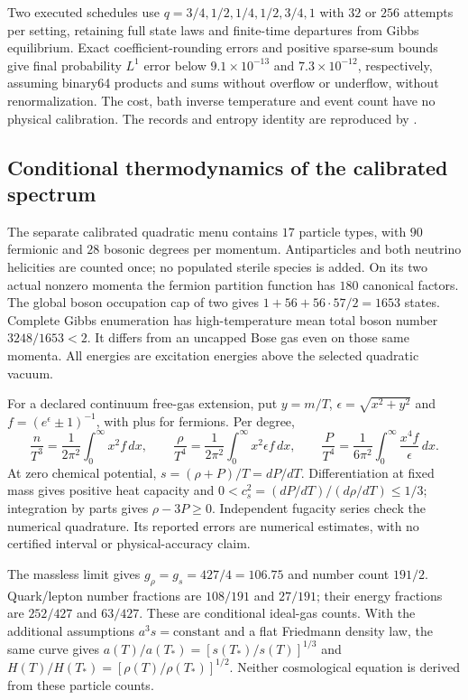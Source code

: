 Two executed schedules use $q=3/4,1/2,1/4,1/2,3/4,1$ with $32$ or $256$
attempts per setting, retaining full state laws and finite-time departures
from Gibbs equilibrium. Exact coefficient-rounding errors and positive
sparse-sum bounds give final probability $L^1$ error below
$9.1\times10^{-13}$ and $7.3\times10^{-12}$, respectively, assuming
binary64 products and sums without overflow or underflow, without
renormalization. The cost,
bath inverse temperature and event count have no physical calibration.
The records and entropy identity are reproduced by
 \cite{ophrepo}.

\subsection{Conditional thermodynamics of the calibrated spectrum}

The separate calibrated quadratic menu contains $17$ particle types,
with $90$ fermionic and $28$ bosonic degrees per momentum. Antiparticles
and both neutrino helicities are counted once; no populated sterile
species is added. On its two actual nonzero momenta the fermion
partition function has $180$ canonical factors. The global boson
occupation cap of two gives $1+56+56\cdot57/2=1653$ states. Complete
Gibbs enumeration has high-temperature mean total boson number
$3248/1653<2$. It differs from an uncapped Bose gas even on those same
momenta. All energies are excitation energies above the selected
quadratic vacuum.

For a declared continuum free-gas extension, put
$y=m/T$, $\epsilon=\sqrt{x^2+y^2}$ and
$f=(e^\epsilon\pm1)^{-1}$, with plus for fermions. Per degree,
\[
 \frac{n}{T^3}=\frac1{2\pi^2}\int_0^\infty x^2f\,dx,\qquad
 \frac{\rho}{T^4}=\frac1{2\pi^2}\int_0^\infty x^2\epsilon f\,dx,
 \qquad
 \frac{P}{T^4}=\frac1{6\pi^2}\int_0^\infty\frac{x^4f}{\epsilon}\,dx.
\]
At zero chemical potential, $s=(\rho+P)/T=dP/dT$.
Differentiation at fixed mass gives positive heat capacity and
$0<c_s^2=(dP/dT)/(d\rho/dT)\leq1/3$; integration by parts gives
$\rho-3P\geq0$. Independent fugacity series check the numerical
quadrature. Its reported errors are numerical estimates, with no
certified interval or physical-accuracy claim.

The massless limit gives $g_{\rho}=g_s=427/4=106.75$ and number count
$191/2$. Quark/lepton number fractions are $108/191$ and $27/191$;
their energy fractions are $252/427$ and $63/427$. These are conditional
ideal-gas counts. With the additional assumptions $a^3s=\mathrm{constant}$
and a flat Friedmann density law, the same curve gives
$a(T)/a(T_*)=[s(T_*)/s(T)]^{1/3}$ and
$H(T)/H(T_*)=[\rho(T)/\rho(T_*)]^{1/2}$. Neither cosmological equation
is derived from these particle counts.

